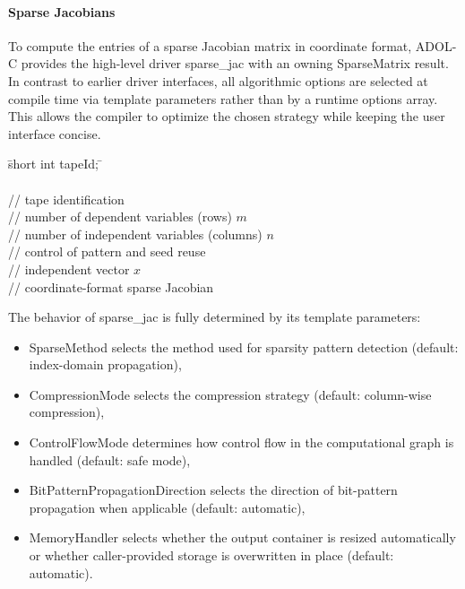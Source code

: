 \documentclass[11pt,twoside]{article}
\begin{document}
\paragraph{Sparse Jacobians}
%
To compute the entries of a sparse Jacobian matrix in coordinate
format, ADOL-C provides the high-level driver
{\sf sparse\_jac} with an owning {\sf SparseMatrix} result.
%
In contrast to earlier driver interfaces, all algorithmic options are
selected at compile time via template parameters rather than by a
runtime {\sf options} array. This allows the compiler to optimize the
chosen strategy while keeping the user interface concise.
%
\begin{tabbing}
\hspace{0.5in}\={\sf short int tapeId;} \hspace{1.2in}\= \kill
{}\\
\\
          \> // tape identification \\
              \> // number of dependent variables (rows) $m$ \\
              \> // number of independent variables (columns) $n$ \\
             \> // control of pattern and seed reuse\\
\> // independent vector $x$ \\
 \> // coordinate-format sparse Jacobian \\
\end{tabbing}
%
The behavior of {\sf sparse\_jac} is fully determined by its template
parameters:
\begin{itemize}
  \item {\sf SparseMethod} selects the method used for sparsity pattern
        detection (default: index-domain propagation),
  \item {\sf CompressionMode} selects the compression strategy (default: column-wise compression),
  \item {\sf ControlFlowMode} determines how control flow in the
        computational graph is handled (default: safe mode),
  \item {\sf BitPatternPropagationDirection} selects the direction of
        bit-pattern propagation when applicable (default: automatic),
  \item {\sf MemoryHandler} selects whether the output container is resized
        automatically or whether caller-provided storage is overwritten in
        place (default: automatic).
\end{itemize}
\end{document}
